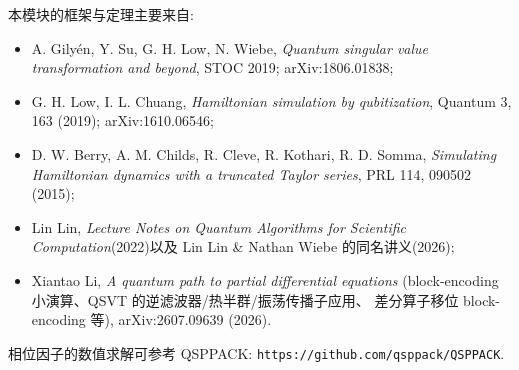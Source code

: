 \documentclass[utf8]{article} %
\numberwithin{equation}{section}   %
\newtheorem{Note}{\hskip 2em {\color{red} 注}}[subsection]
\begin{document}
\begin{Note}[本模块的主要文献]
    本模块的框架与定理主要来自:
    \begin{itemize}
        \item A. Gilyén, Y. Su, G. H. Low, N. Wiebe, \emph{Quantum singular value
        transformation and beyond}, STOC 2019; arXiv:1806.01838;
        \item G. H. Low, I. L. Chuang, \emph{Hamiltonian simulation by qubitization},
        Quantum 3, 163 (2019); arXiv:1610.06546;
        \item D. W. Berry, A. M. Childs, R. Cleve, R. Kothari, R. D. Somma,
        \emph{Simulating Hamiltonian dynamics with a truncated Taylor series},
        PRL 114, 090502 (2015);
        \item Lin Lin, \emph{Lecture Notes on Quantum Algorithms for Scientific
        Computation}(2022)以及 Lin Lin \& Nathan Wiebe 的同名讲义(2026);
        \item Xiantao Li, \emph{A quantum path to partial differential equations}
        (block-encoding 小演算、QSVT 的逆滤波器/热半群/振荡传播子应用、
        差分算子移位 block-encoding 等), arXiv:2607.09639 (2026).
    \end{itemize}
    相位因子的数值求解可参考 QSPPACK: \texttt{https://github.com/qsppack/QSPPACK}.
\end{Note}
\end{document}

